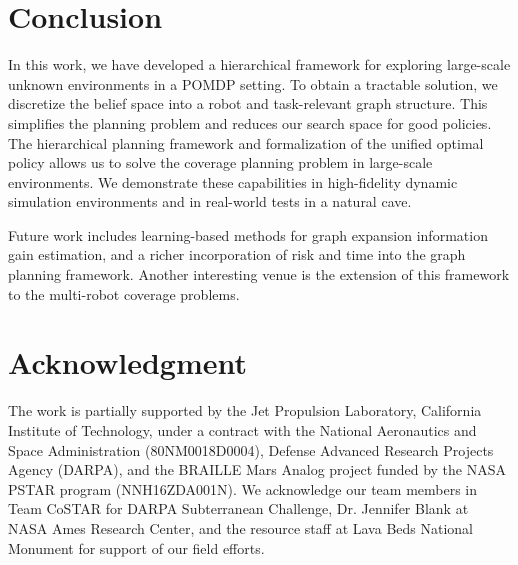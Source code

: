 \documentclass[letterpaper]{article} %
\begin{document}
\section{Conclusion}\label{sec:conclusion}

In this work, we have developed a hierarchical framework for exploring large-scale unknown environments in a POMDP setting. 
To obtain a tractable solution, we discretize the belief space into a robot and task-relevant graph structure. This simplifies the planning problem and reduces our search space for good policies.
The hierarchical planning framework and formalization of the unified optimal policy allows us to solve the coverage planning problem in large-scale environments.
We demonstrate these capabilities in high-fidelity dynamic simulation environments and in real-world tests in a natural cave.  

Future work includes learning-based methods for graph expansion information gain estimation, and a richer incorporation of risk and time into the graph planning framework.
Another interesting venue is the extension of this framework to the multi-robot coverage problems.


\section*{Acknowledgment}
The work is partially supported by the Jet Propulsion Laboratory, California Institute of Technology, under a contract with the National Aeronautics and Space Administration (80NM0018D0004), Defense Advanced Research Projects Agency (DARPA), and the BRAILLE Mars Analog project funded by the NASA PSTAR program (NNH16ZDA001N).
We acknowledge our team members in Team CoSTAR for DARPA Subterranean Challenge, Dr. Jennifer Blank at NASA Ames Research Center, and the resource staff at Lava Beds National Monument for support of our field efforts.




\end{document}
